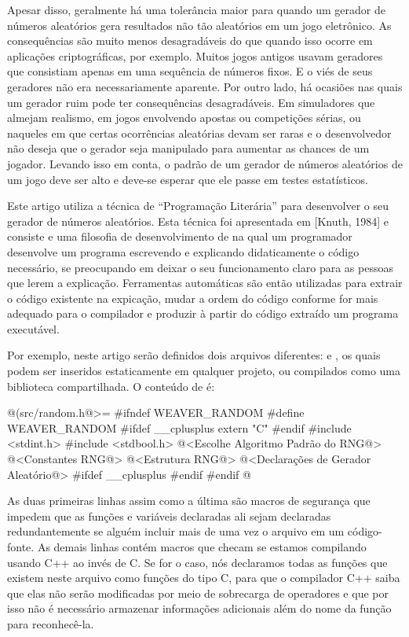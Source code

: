 Apesar disso, geralmente há uma tolerância maior para quando um
gerador de números aleatórios gera resultados não tão aleatórios em um
jogo eletrônico. As consequências são muito menos desagradáveis do que
quando isso ocorre em aplicações criptográficas, por exemplo. Muitos
jogos antigos usavam geradores que consistiam apenas em uma sequência
de números fixos. E o viés de seus geradores não era necessariamente
aparente. Por outro lado, há ocasiões nas quais um gerador ruim pode
ter consequências desagradáveis. Em simuladores que almejam realismo,
em jogos envolvendo apostas ou competições sérias, ou naqueles em que
certas ocorrências aleatórias devam ser raras e o desenvolvedor não
deseja que o gerador seja manipulado para aumentar as chances de um
jogador. Levando isso em conta, o padrão de um gerador de números
aleatórios de um jogo deve ser alto e deve-se esperar que ele passe em
testes estatísticos.


Este artigo utiliza a técnica de ``Programação Literária'' para
desenvolver o seu gerador de números aleatórios. Esta técnica foi apresentada
em [Knuth, 1984] e consiste e uma filosofia de desenvolvimento de
 na qual um programador desenvolve um programa escrevendo
e explicando didaticamente o código necessário, se preocupando em
deixar o seu funcionamento claro para as pessoas que lerem a
explicação. Ferramentas automáticas são então utilizadas para extrair
o código existente na expicação, mudar a ordem do código conforme for
mais adequado para o compilador e produzir à partir do código extraído
um programa executável.

Por exemplo, neste artigo serão definidos dois arquivos
diferentes:  e , os quais
podem ser inseridos estaticamente em qualquer projeto, ou compilados
como uma biblioteca compartilhada. O conteúdo de 
é:

\iniciocodigo
@(src/random.h@>=
#ifndef WEAVER_RANDOM
#define WEAVER_RANDOM
#ifdef __cplusplus
extern "C" {
#endif
#include <stdint.h>
#include <stdbool.h>
@<Escolhe Algoritmo Padrão do RNG@>
@<Constantes RNG@>
@<Estrutura RNG@>
@<Declarações de Gerador Aleatório@>
#ifdef __cplusplus
}
#endif
#endif
@
\fimcodigo

As duas primeiras linhas assim como a última são macros de segurança
que impedem que as funções e variáveis declaradas ali sejam declaradas
redundantemente se alguém incluir mais de uma vez o arquivo em um
código-fonte. As demais linhas contém macros que checam se estamos
compilando usando C++ ao invés de C. Se for o caso, nós declaramos
todas as funções que existem neste arquivo como funções do tipo C,
para que o compilador C++ saiba que elas não serão modificadas por
meio de sobrecarga de operadores e que por isso não é necessário
armazenar informações adicionais além do nome da função para
reconhecê-la.

